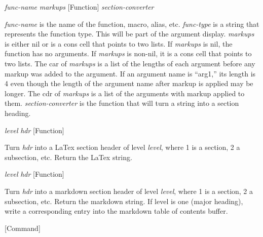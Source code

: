 \vspace{1em}
\noindent
{}
\usebox{\funcname}\emph{func-name} \emph{markups}
 \hfill [Function]
\hspace*{\wd\funcname}\emph{section-converter}

\begin{doc-string}
\emph{func-name} is the name of the function, macro, alias, etc.  \emph{func-type} is a
string that represents the function type.  This will be part of the argument
display.  \emph{markups} is either nil or is a cons cell that points to two lists.  If
\emph{markups} is nil, the function has no arguments.  If \emph{markups} is non-nil, it is a
cons cell that points to two lists.  The car of \emph{markups} is a list of the lengths
of each argument before any markup was added to the argument.  If an argument
name is ``arg1,'' its length is 4 even though the length of the argument name
after markup is applied may be longer.  The cdr of \emph{markups} is a list of the
arguments with markup applied to them.  \emph{section-converter} is the function that
will turn a string into a section heading.
\end{doc-string}

\vspace{1em}
\noindent
{}
\usebox{\funcname}\emph{level} \emph{hdr}
 \hfill [Function]

\begin{doc-string}
Turn \emph{hdr} into a LaTex section header of level \emph{level}, where 1 is a section,
2 a subsection, etc.  Return the LaTex string.
\end{doc-string}

\vspace{1em}
\noindent
{}
\usebox{\funcname}\emph{level} \emph{hdr}
 \hfill [Function]

\begin{doc-string}
Turn \emph{hdr} into a markdown section header of level \emph{level}, where 1 is a section,
2 a subsection, etc.  Return the markdown string.  If level is one (major heading),
write a corresponding entry into the markdown table of contents buffer.
\end{doc-string}

\vspace{1em}
\noindent
{}
\usebox{\funcname}
 \hfill [Command]

